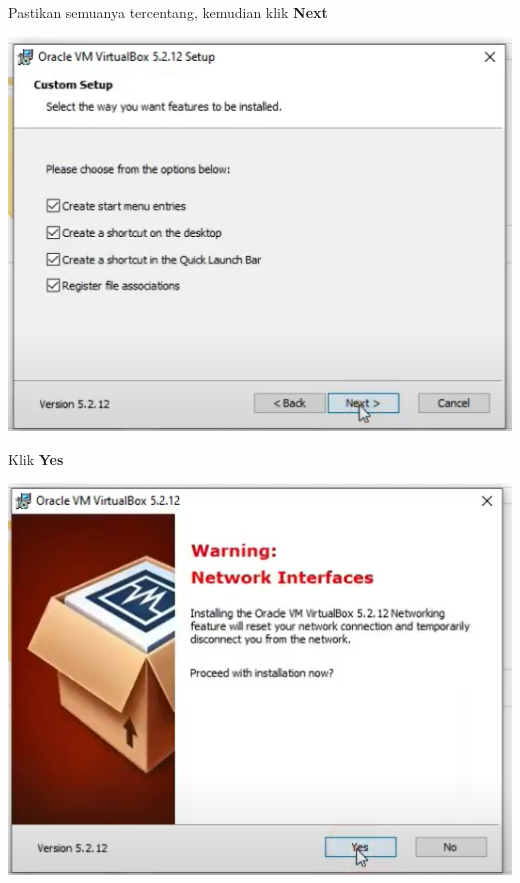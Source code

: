 \documentclass{article}
\begin{document}
\begin{flushleft}
\begin{itemize}
        		Pastikan semuanya tercentang, kemudian klik \textbf{Next \>} \\
        		
        		\begin{center}
        			\includegraphics[scale=0.7]{Screenshot (254)} \\
        		\end{center}
        		
        		Klik \textbf{Yes}
        		
        		\begin{center}
        			\includegraphics[scale=0.7]{Screenshot (255)} \\
        		\end{center}
        		

\end{itemize}
\end{flushleft}
\end{document}
